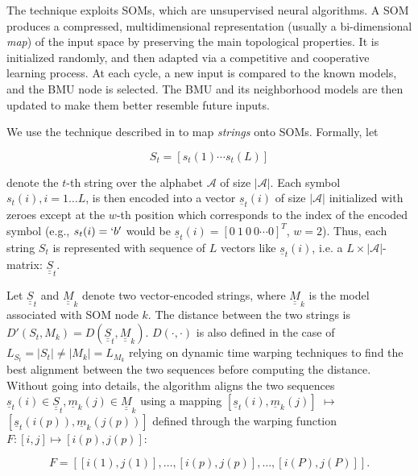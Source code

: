 The technique exploits \acp{SOM}, which are unsupervised neural algorithms. A \ac{SOM} produces a compressed, multidimensional representation (usually a bi-dimensional \emph{map}) of the input space by preserving the main topological properties. It is initialized randomly, and then adapted via a competitive and cooperative learning process. At each cycle, a new input is compared to the known models, and the \ac{BMU} node is selected. The \ac{BMU} and its neighborhood models are then updated to make them better resemble future inputs.

We use the technique described in \citep{symbolsom_intro} to map \emph{strings} onto \acp{SOM}. Formally, let

\begin{displaymath}
  S_{t} = [s_{t}(1)\cdots s_{t}(L)]
\end{displaymath}

denote the $t$-th string over the alphabet $\mathcal{A}$ of size $|\mathcal{A}|$. Each symbol $s_{t}(i), i = 1 \ldots L$, is then encoded into a vector $\underline{s}_{t}(i)$ of size $|\mathcal{A}|$ initialized with zeroes except at the $w$-th position which corresponds to the index of the encoded symbol (e.g., $s_{t}(i) = `b'$ would be $\underline{s}_{t}(i) = [0~1~0~0 \cdots 0]^{T}$, $w = 2$). Thus, each string $S_{t}$ is represented with sequence of $L$ vectors like $\underline{s}_{t}(i)$, i.e. a $L \times |\mathcal{A}|$-matrix: $\underline{\underline{S}}_{t}$.

Let $\underline{\underline{S}}_{t}$ and
$\underline{\underline{M}}_{k}$ denote two vector-encoded strings,
where $\underline{\underline{M}}_{k}$ is the model associated with
\ac{SOM} node $k$. The distance between the two strings is
$D'(S_{t}, M_{k}) = D(\underline{\underline{S}}_{t},
\underline{\underline{M}}_{k})$. $D(\cdot, \cdot)$ is also defined in
the case of $L_{S_{t}} = |S_{t}| \neq |M_{k}| = L_{M_{k}}$ relying on
dynamic time warping techniques to find the best alignment between the
two sequences before computing the distance. Without going into
details, the algorithm \citep{symbolsom_online} aligns the two
sequences $\underline{s}_{t}(i) \in \underline{\underline{S}}_{t},
\underline{m}_{k}(j) \in \underline{\underline{M}}_{k}$ using a
mapping $[\underline{s}_{t}(i), \underline{m}_{k}(j)]$ $\mapsto$
$[\underline{s}_{t}(i(p)), \underline{m}_{k}(j(p))]$ defined through
the warping function $F: [i, j] \mapsto [i(p), j(p)]$:

\begin{displaymath}
  F = [[i(1), j(1)], \dots, [i(p), j(p)], \dots, [i(P), j(P)]].
\end{displaymath}


